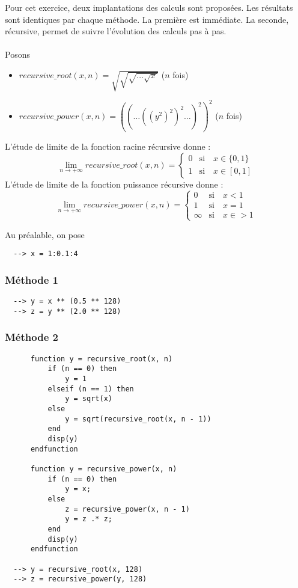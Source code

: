 \documentclass[a4paper,12pt]{article}
\begin{document}
Pour cet exercice, deux implantations des calculs sont proposées. Les résultats sont identiques par chaque méthode. La première est immédiate. La seconde, récursive, permet de suivre l'évolution des calculs pas à pas.\\\\
Posons
\begin{itemize}
  \item $recursive\_root(x, n) = \sqrt{\sqrt{\sqrt {\dots{\sqrt{ x}}}}}$ ($n$ fois)
  \item $recursive\_power(x, n) = ((\dots((y^2)^2)^2\dots)^2)^2$ ($n$ fois)
\end{itemize}
L'étude de limite de la fonction racine récursive donne :
$$
\lim\limits_{n \to +\infty} recursive\_root(x, n) = \left\{
    \begin{array}{ll}
        0 & \text{si} \quad x \in \{0, 1\} \\
        1 & \text{si} \quad x \in [0, 1]
    \end{array}
\right.
$$
L'étude de limite de la fonction puissance récursive donne :
$$
\lim\limits_{n \to +\infty} recursive\_power(x, n) = \left\{
    \begin{array}{ll}
        0 & \text{si} \quad x < 1 \\
        1 & \text{si} \quad x = 1 \\
        \infty & \text{si} \quad x \in > 1
    \end{array}
\right.
$$


Au préalable, on pose
\begin{verbatim}
  --> x = 1:0.1:4
\end{verbatim}

\subsubsection{Méthode 1}
\begin{verbatim}
  --> y = x ** (0.5 ** 128)
  --> z = y ** (2.0 ** 128)
\end{verbatim}

\subsubsection{Méthode 2}
\begin{verbatim}
      function y = recursive_root(x, n)
          if (n == 0) then
              y = 1
          elseif (n == 1) then
              y = sqrt(x)
          else
              y = sqrt(recursive_root(x, n - 1))
          end
          disp(y)
      endfunction

      function y = recursive_power(x, n)
          if (n == 0) then
              y = x;
          else
              z = recursive_power(x, n - 1)
              y = z .* z;
          end
          disp(y)
      endfunction

  --> y = recursive_root(x, 128)
  --> z = recursive_power(y, 128)
\end{verbatim}
\end{document}

